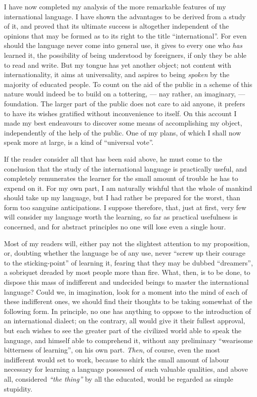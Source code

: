 \documentclass[12pt,twoside]{book}
\begin{document}
I have now completed my analysis of the more remarkable features of my international language. I have shown the advantages to be derived from a study of it, and proved that its ultimate success is altogether independent of the opinions that may be formed as to its right to the title “international”. For even should the language never come into general use, it gives to every one who \emph{has} learned it, the possibility of being understood by foreigners, if only they be able to read and write. But my tongue has yet another object; not content with internationality, it aims at universality, and aspires to being \emph{spoken} by the majority of educated people. To count on the aid of the public in a scheme of this nature would indeed be to build on a tottering, --- nay rather, an imaginary, --- foundation. The larger part of the public does not care to aid anyone, it prefers to have its wishes gratified without inconvenience to itself. On this account I made my best endeavours to discover some means of accomplishing my object, independently of the help of the public. One of my plans, of which I shall now speak more at large, is a kind of “universal vote”.

If the reader consider all that has been said above, he must come to the conclusion that the study of the international language is practically useful, and completely remunerates the learner for the small amount of trouble he has to expend on it. For my own part, I am naturally wishful that the whole of mankind should take up my language, but I had rather be prepared for the worst, than form too sanguine anticipations. I suppose therefore, that, just at first, very few will consider my language worth the learning, so far as practical usefulness is concerned, and for abstract principles no one will lose even a single hour.

Most of my readers will, either pay not the slightest attention to my proposition, or, doubting whether the language be of any use, never “screw up their courage to the sticking-point” of learning it, fearing that they may be dubbed “dreamers”, a sobriquet dreaded by most people more than fire. What, then, is to be done, to dispose this mass of indifferent and undecided beings to master the international language? Could we, in imagination, look for a moment into the mind of each of these indifferent ones, we should find their thoughts to be taking somewhat of the following form. In principle, no one has anything to oppose to the introduction of an international dialect; on the contrary, all would give it their fullest approval, but each wishes to see the greater part of the civilized world able to speak the language, and himself able to comprehend it, without any preliminary “wearisome bitterness of learning”, on his own part. \emph{Then}, of course, even the most indifferent would set to work, because to shirk the small amount of labour necessary for learning a language possessed of such valuable qualities, and above all, considered \emph{``the thing''} by all the educated, would be regarded as simple stupidity.
\end{document}
